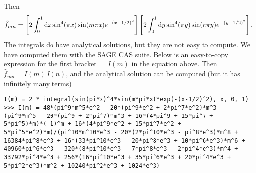 Then
\begin{equation*}
	\hat{f}_{mn} =
	\left[ 2 \integral{\sin^4(\pi x) \sin(m \pi x) e^{-(x-1/2)^2}}{x}{0}{1}\right]
	\left[ 2 \integral{\sin^4(\pi y) \sin(n \pi y) e^{-(y-1/2)^2}}{y}{0}{1}\right].
\end{equation*}
The integrals do have analytical solutions, but they are not easy to compute.
We have computed them with the SAGE CAS suite.
Below is an easy-to-copy expression for the first bracket $ = I(m)$ in the equation above.
Then $\hat{f}_{mn} = I(m) \, I(n)$, and the analytical solution can be computed (but it has infinitely many terms)
\begin{lstlisting}
I(m) = 2 * integral(sin(pi*x)^4*sin(m*pi*x)*exp(-(x-1/2)^2), x, 0, 1)
>>> I(m) = 48*(pi^9*m^5*e^2 - 20*(pi^9*e^2 + 2*pi^7*e^2)*m^3 - (pi^9*m^5 - 20*(pi^9 + 2*pi^7)*m^3 + 16*(4*pi^9 + 15*pi^7 + 5*pi^5)*m)*(-1)^m + 16*(4*pi^9*e^2 + 15*pi^7*e^2 + 5*pi^5*e^2)*m)/(pi^10*m^10*e^3 - 20*(2*pi^10*e^3 - pi^8*e^3)*m^8 + 16384*pi^8*e^3 + 16*(33*pi^10*e^3 - 20*pi^8*e^3 + 10*pi^6*e^3)*m^6 + 40960*pi^6*e^3 - 320*(8*pi^10*e^3 - 7*pi^8*e^3 - 2*pi^4*e^3)*m^4 + 33792*pi^4*e^3 + 256*(16*pi^10*e^3 + 35*pi^6*e^3 + 20*pi^4*e^3 + 5*pi^2*e^3)*m^2 + 10240*pi^2*e^3 + 1024*e^3)
\end{lstlisting}

\begin{figure}
\end{figure}
